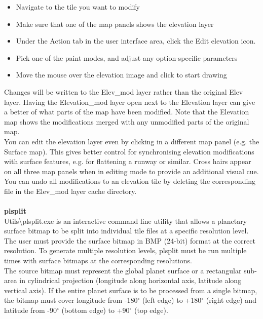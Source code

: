 \documentclass[Orbiter Developer Manual.tex]{subfiles}
\begin{document}
\begin{itemize}
\item Navigate to the tile you want to modify
\item Make sure that one of the map panels shows the elevation layer
\item Under the Action tab in the user interface area, click the Edit elevation icon.
\item Pick one of the paint modes, and adjust any option-specific parameters
\item Move the mouse over the elevation image and click to start drawing
\end{itemize}

\noindent
Changes will be written to the Elev\_mod layer rather than the original Elev layer. Having the Elevation\_mod layer open next to the Elevation layer can give a better of what parts of the map have been modified. Note that the Elevation map shows the modifications merged with any unmodified parts of the original map.\\
You can edit the elevation layer even by clicking in a different map panel (e.g. the Surface map). This gives better control for synchronising elevation modifications with surface features, e.g. for flattening a runway or similar. Cross hairs appear on all three map panels when in editing mode to provide an additional visual cue.\\
You can undo all modifications to an elevation tile by deleting the corresponding file in the Elev\_mod layer cache directory.\\
\\
\textbf{plsplit}\\
Utils\textbackslash plsplit.exe is an interactive command line utility that allows a planetary surface bitmap to be split into individual tile files at a specific resolution level.\\
The user must provide the surface bitmap in BMP (24-bit) format at the correct resolution. To generate multiple resolution levels, plsplit must be run multiple times with surface bitmaps at the corresponding resolutions.\\
The source bitmap must represent the global planet surface or a rectangular sub-area in cylindrical projection (longitude along horizontal axis, latitude along vertical axis). If the entire planet surface is to be processed from a single bitmap, the bitmap must cover longitude from -180$^{\circ}$ (left edge) to +180$^{\circ}$ (right edge) and latitude from -90$^{\circ}$ (bottom edge) to +90$^{\circ}$ (top edge).\\
\end{document}
